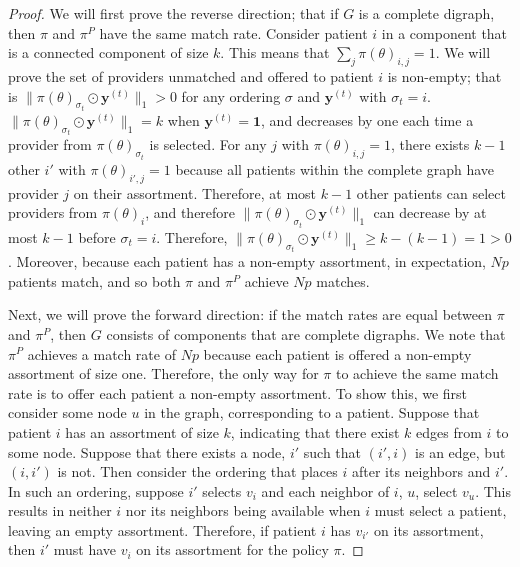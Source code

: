 \begin{proof}
We will first prove the reverse direction; that if $G$ is a complete digraph, then $\pi$ and $\pi^{P}$ have the same match rate. 
Consider patient $i$ in a component that is a connected component of size $k$. 
This means that $\sum_{j} \pi(\theta)_{i,j} = 1$. 
We will prove the set of providers unmatched and offered to patient $i$ is non-empty; that is $\lVert \pi(\theta)_{\sigma_{t}} \odot \mathbf{y}^{(t)} \rVert_{1} > 0$ for any ordering $\sigma$ and $\mathbf{y}^{(t)}$ with $\sigma_{t}=i$. 
$\lVert \pi(\theta)_{\sigma_{t}} \odot \mathbf{y}^{(t)} \rVert_{1} = k$ when $\mathbf{y}^{(t)} = \mathbf{1}$, and decreases by one each time a provider from $\pi(\theta)_{\sigma_{t}}$ is selected. 
For any $j$ with $\pi(\theta)_{i,j}=1$, there exists  $k-1$ other $i'$ with $\pi(\theta)_{i',j}=1$ because all patients within the complete graph have provider $j$ on their assortment. 
Therefore, at most $k-1$ other patients can select providers from $\pi(\theta)_{i}$, and therefore $\lVert \pi(\theta)_{\sigma_{t}} \odot \mathbf{y}^{(t)} \rVert_{1}$ can decrease by at most $k-1$ before $\sigma_{t}=i$. 
Therefore, $\lVert \pi(\theta)_{\sigma_{t}} \odot \mathbf{y}^{(t)} \rVert_{1} \geq k-(k-1) = 1 > 0$. 
Moreover, because each patient has a non-empty assortment, in expectation, $Np$ patients match, and so both $\pi$ and $\pi^{P}$ achieve $Np$ matches. 

Next, we will prove the forward direction: if the match rates are equal between $\pi$ and $\pi^{P}$, then $G$ consists of components that are complete digraphs. 
We note that $\pi^{P}$ achieves a match rate of $Np$ because each patient is offered a non-empty assortment of size one. 
Therefore, the only way for $\pi$ to achieve the same match rate is to offer each patient a non-empty assortment. 
To show this, we first consider some node $u$ in the graph, corresponding to a patient. 
Suppose that patient $i$ has an assortment of size $k$, indicating that there exist $k$ edges from $i$ to some node. 
Suppose that there exists a node, $i'$ such that $(i',i)$ is an edge, but $(i,i')$ is not. 
Then consider the ordering that places $i$ after its neighbors and $i'$. 
In such an ordering, suppose $i'$ selects $v_{i}$ and each neighbor of $i$, $u$, select $v_{u}$. 
This results in neither $i$ nor its neighbors being available when $i$ must select a patient, leaving an empty assortment.
Therefore, if patient $i$ has $v_{i'}$ on its assortment, then $i'$ must have $v_{i}$ on its assortment for the policy $\pi$. 


\end{proof}
